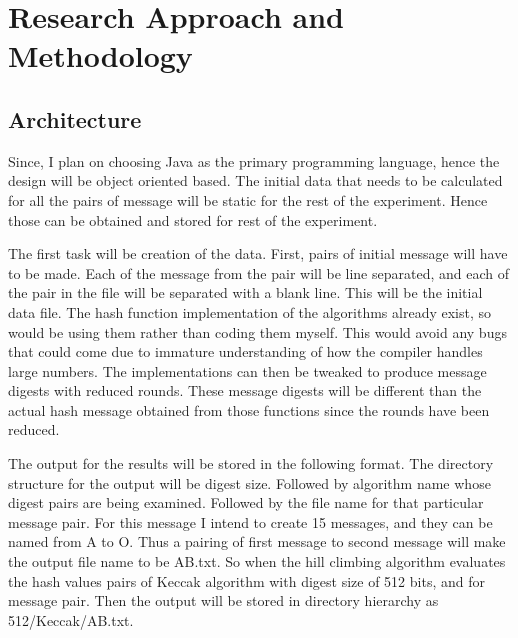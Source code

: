 \chapter{Research Approach and Methodology}







\section{Architecture}

Since, I plan on choosing Java as the primary programming language, hence the design will be 
object oriented based. The initial data that needs to be calculated for all the pairs of message
will be static for the rest of the experiment. Hence those can be obtained and stored for rest
of the experiment.

The first task will be creation of the data. First, pairs of initial message will have to be 
made. Each of the message from the pair will be line separated, and each of the pair in the file
will be separated with a blank line. This will be the initial data file. The hash function 
implementation of the algorithms already exist, so would be using them rather than coding them 
myself. This would avoid any bugs that could come due to immature understanding of how the compiler
handles large numbers. The implementations can then be tweaked to produce message digests with 
reduced rounds. These message digests will be different than the actual hash message obtained from
those functions since the rounds have been reduced.

The output for the results will be stored in the following format. The directory structure for the
output will be digest size. Followed by algorithm name whose digest pairs are being examined. Followed
by the file name for that particular message pair. For this message I intend to create 15 messages,
and they can be named from A to O. Thus a pairing of first message to second message will make the
output file name to be AB.txt. So when the hill climbing algorithm evaluates the hash values pairs
of Keccak algorithm with digest size of 512 bits, and for message pair. Then the output will be stored
in directory hierarchy as 512/Keccak/AB.txt.

